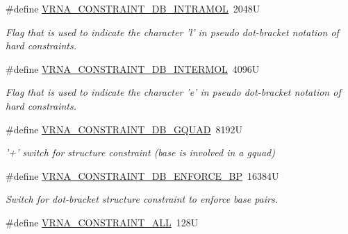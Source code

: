 \begin{DoxyCompactItemize}
\#define \hyperlink{group__constraints_ga5c17253f5a39d1d49b0fb11f5196982a}{V\-R\-N\-A\-\_\-\-C\-O\-N\-S\-T\-R\-A\-I\-N\-T\-\_\-\-D\-B\-\_\-\-I\-N\-T\-R\-A\-M\-O\-L}~2048\-U
\begin{DoxyCompactList}\small\item\em Flag that is used to indicate the character 'l' in pseudo dot-\/bracket notation of hard constraints. \end{DoxyCompactList}\item 
\#define \hyperlink{group__constraints_ga31d0ebb9755ca8a4acafc14f00ca755d}{V\-R\-N\-A\-\_\-\-C\-O\-N\-S\-T\-R\-A\-I\-N\-T\-\_\-\-D\-B\-\_\-\-I\-N\-T\-E\-R\-M\-O\-L}~4096\-U
\begin{DoxyCompactList}\small\item\em Flag that is used to indicate the character 'e' in pseudo dot-\/bracket notation of hard constraints. \end{DoxyCompactList}\item 
\#define \hyperlink{group__constraints_ga75cfab03cdc97c95b3ce8bb29f52b08e}{V\-R\-N\-A\-\_\-\-C\-O\-N\-S\-T\-R\-A\-I\-N\-T\-\_\-\-D\-B\-\_\-\-G\-Q\-U\-A\-D}~8192\-U
\begin{DoxyCompactList}\small\item\em '+' switch for structure constraint (base is involved in a gquad) \end{DoxyCompactList}\item 
\#define \hyperlink{group__constraints_ga29ebe940110d60ab798fdacbcdbbfb7d}{V\-R\-N\-A\-\_\-\-C\-O\-N\-S\-T\-R\-A\-I\-N\-T\-\_\-\-D\-B\-\_\-\-E\-N\-F\-O\-R\-C\-E\-\_\-\-B\-P}~16384\-U
\begin{DoxyCompactList}\small\item\em Switch for dot-\/bracket structure constraint to enforce base pairs. \end{DoxyCompactList}\item 
\hypertarget{group__constraints_ga0a697f77a6fbb10f34e16fa68ed9e655}{\#define \hyperlink{group__constraints_ga0a697f77a6fbb10f34e16fa68ed9e655}{V\-R\-N\-A\-\_\-\-C\-O\-N\-S\-T\-R\-A\-I\-N\-T\-\_\-\-A\-L\-L}~128\-U}\label{group__constraints_ga0a697f77a6fbb10f34e16fa68ed9e655}


\end{DoxyCompactItemize}
